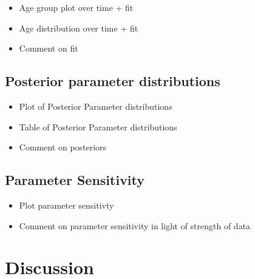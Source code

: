 \documentclass[11pt,twoside]{bristolthesis}
\providecommand{\tightlist}{%
  \setlength{\itemsep}{0pt}\setlength{\parskip}{0pt}}
\begin{document}
  \begin{itemize}
  \tightlist
  \item
    Age group plot over time + fit
  \item
    Age distribution over time + fit
  \item
    Comment on fit
  \end{itemize}
  \hypertarget{posterior-parameter-distributions}{%
  \subsection{Posterior parameter distributions}\label{posterior-parameter-distributions}}
  \begin{itemize}
  \tightlist
  \item
    Plot of Posterior Parameter distributions
  \item
    Table of Posterior Parameter distributions
  \item
    Comment on posteriors
  \end{itemize}
  \hypertarget{parameter-sensitivity-1}{%
  \subsection{Parameter Sensitivity}\label{parameter-sensitivity-1}}
  \begin{itemize}
  \tightlist
  \item
    Plot parameter sensitivty
  \item
    Comment on parameter sensitivity in light of strength of data
  \end{itemize}
  \hypertarget{discussion-4}{%
  \section{Discussion}\label{discussion-4}}
  
\end{document}
